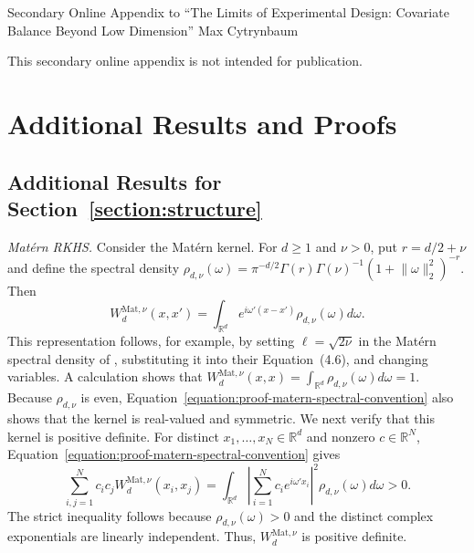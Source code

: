 \documentclass[letterpaper,12pt]{article}
\theoremstyle{definition}
\numberwithin{equation}{section}
\newcommand{\norm}[1]{\lVert#1\rVert}
\begin{document}
\clearpage

\hypersetup{pageanchor=false}

\begin{center}
{\Large Secondary Online Appendix to ``The Limits of Experimental Design: Covariate Balance Beyond Low Dimension''}
\vskip 24pt
{\large Max Cytrynbaum}
\end{center}

This secondary online appendix is not intended for publication.

\setcounter{thm}{0}
\setcounter{equation}{0}

\section{Additional Results and Proofs}

\subsection{Additional Results for Section~\ref*{section:structure}}

\emph{Mat\'ern RKHS.}
Consider the Mat\'ern kernel.
For $d\geq1$ and $\nu>0$, put $r=d/2+\nu$ and define the spectral density $\rho_{d,\nu}(\omega)=\pi^{-d/2}\Gamma(r)\Gamma(\nu)^{-1}(1+\norm{\omega}_2^2)^{-r}$.
Then
\begin{equation}\label{equation:proof-matern-spectral-convention}
W_d^{\mathrm{Mat},\nu}(x,x')=\int_{\mathbb R^d}e^{i\omega'(x-x')}\rho_{d,\nu}(\omega)d\omega.
\end{equation}
This representation follows, for example, by setting $\ell=\sqrt{2\nu}$ in the Mat\'ern spectral density of \citet[Equation~(4.15)]{rasmussen2006gaussian}, substituting it into their Equation~(4.6), and changing variables.
A calculation shows that $W_d^{\mathrm{Mat},\nu}(x,x)=\int_{\mathbb R^d}\rho_{d,\nu}(\omega)d\omega=1$.
Because $\rho_{d,\nu}$ is even, Equation~\eqref{equation:proof-matern-spectral-convention} also shows that the kernel is real-valued and symmetric.
We next verify that this kernel is positive definite. For distinct $x_1,\ldots,x_N\in\mathbb R^d$ and nonzero $c\in\mathbb R^N$, Equation~\eqref{equation:proof-matern-spectral-convention} gives
\begin{equation}\label{equation:proof-matern-positive-definite}
\sum_{i,j=1}^Nc_ic_jW_d^{\mathrm{Mat},\nu}(x_i,x_j)=\int_{\mathbb R^d}\left|\sum_{i=1}^Nc_ie^{i\omega'x_i}\right|^2\rho_{d,\nu}(\omega)d\omega>0.
\end{equation}
The strict inequality follows because $\rho_{d,\nu}(\omega)>0$ and the distinct complex exponentials are linearly independent. Thus, $W_d^{\mathrm{Mat},\nu}$ is positive definite.
\end{document}
